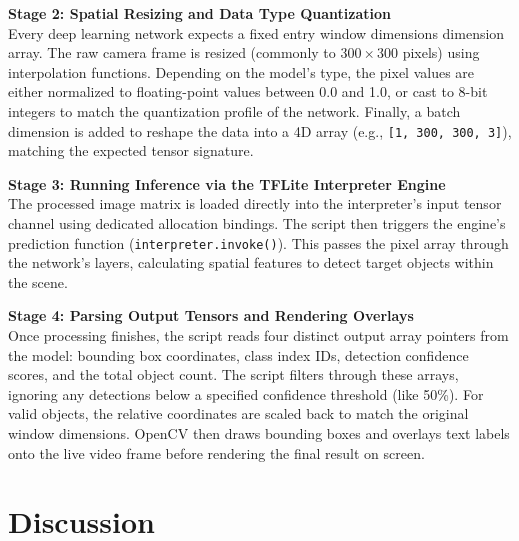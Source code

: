 \documentclass[12pt,a4paper]{article}
\begin{document}
\vspace{0.3cm}

\noindent \textbf{Stage 2: Spatial Resizing and Data Type Quantization}\\
Every deep learning network expects a fixed entry window dimensions dimension array. The raw camera frame is resized (commonly to $300\times300$ pixels) using interpolation functions. Depending on the model's type, the pixel values are either normalized to floating-point values between 0.0 and 1.0, or cast to 8-bit integers to match the quantization profile of the network. Finally, a batch dimension is added to reshape the data into a 4D array (e.g., \texttt{[1, 300, 300, 3]}), matching the expected tensor signature.

\vspace{0.3cm}

\noindent \textbf{Stage 3: Running Inference via the TFLite Interpreter Engine}\\
The processed image matrix is loaded directly into the interpreter's input tensor channel using dedicated allocation bindings. The script then triggers the engine's prediction function (\texttt{interpreter.invoke()}). This passes the pixel array through the network's layers, calculating spatial features to detect target objects within the scene.

\vspace{0.3cm}

\noindent \textbf{Stage 4: Parsing Output Tensors and Rendering Overlays}\\
Once processing finishes, the script reads four distinct output array pointers from the model: bounding box coordinates, class index IDs, detection confidence scores, and the total object count. The script filters through these arrays, ignoring any detections below a specified confidence threshold (like 50\%). For valid objects, the relative coordinates are scaled back to match the original window dimensions. OpenCV then draws bounding boxes and overlays text labels onto the live video frame before rendering the final result on screen.

\newpage

\section{Discussion}
\end{document}
